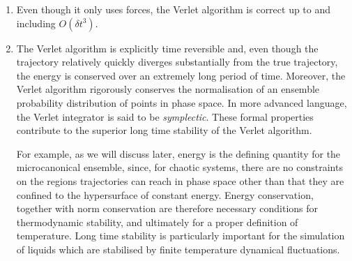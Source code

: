 \documentclass{article}
\theoremstyle{plain}\theoremheaderfont{\normalfont\itshape}\theorembodyfont{\rmfamily}\theoremseparator{.}\newtheorem*{rem}{Remark}\newtheorem*{ex}{Example}\newtheorem*{proof}{Proof}\newtheorem*{altp}{Alternative proof}
\theoremstyle{plain}\theoremheaderfont{\normalfont\bfseries}\theorembodyfont{\rmfamily}\theoremseparator{.}\newtheorem{thm}{Theorem}[section]\newtheorem{lem}[thm]{Lemma}\newtheorem{prop}[thm]{Proposition}\newtheorem*{cor}{Corollary}\newtheorem{defn}[thm]{Definition}\newtheorem{clm}[thm]{Claim}\newtheorem{clminproof}{Claim}\newtheorem{alg}[thm]{Algorithm}\newtheorem{hyp}[thm]{Hypothesis}\newtheorem{law}[thm]{Law}
\theoremstyle{break}\theoremheaderfont{\normalfont\itshape}\theorembodyfont{\rmfamily}\theoremseparator{.\medskip}\newtheorem*{proofskip}{Proof}\newtheorem*{exs}{Examples}\newtheorem*{rems}{Remarks}
\theoremstyle{break}\theoremheaderfont{\normalfont\bfseries}\theorembodyfont{\rmfamily}\theoremseparator{.\medskip}\newtheorem{lemskip}[thm]{Lemma}\newtheorem{defnskip}[thm]{Definition}\newtheorem{propskip}[thm]{Proposition}\newtheorem{thmskip}[thm]{Theorem}
\numberwithin{equation}{section}
\begin{document}
\begin{enumerate}[topsep=0pt,label=(\roman*)]
        Having an exponentially growing error may seems horrible, but it is actually not as big a problem as it seems!
        \begin{thm}[Shadowing theorem]
            Every numerical trajectory will be uniformly close to some true trajectory with slightly altered initial position. In other words, a numerical trajectory is ``shadowed'' by a true one.
        \end{thm}
        \begin{figure}[ht!]
            \centering
        \end{figure}

        This strong molecular chaos is ultimately the justification of methods of statistical mechanics.
        \item Even though it only uses forces, the Verlet algorithm is correct up to and including \(O(\delta t^3)\).
        \item The Verlet algorithm is explicitly time reversible and, even though the trajectory relatively quickly diverges substantially from the true trajectory, the energy is conserved over an extremely long period of time. Moreover, the Verlet algorithm rigorously conserves the normalisation of an ensemble probability distribution of points in phase space. In more advanced language, the Verlet integrator is said to be \textit{symplectic}. These formal properties contribute to the superior long time stability of the Verlet algorithm.
        
        For example, as we will discuss later, energy is the defining quantity for the microcanonical ensemble, since, for chaotic systems, there are no constraints on the regions trajectories can reach in phase space other than that they are confined to the hypersurface of constant energy. Energy conservation, together with norm conservation are therefore necessary conditions for thermodynamic stability, and ultimately for a proper definition of temperature. Long time stability is particularly important for the simulation of liquids which are stabilised by finite temperature dynamical fluctuations.
    \end{enumerate}
\end{document}
